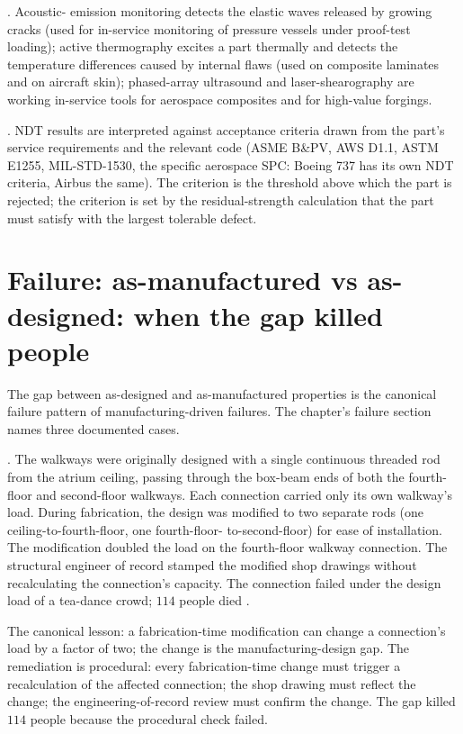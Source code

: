 . Acoustic-
emission monitoring detects the elastic waves released by growing
cracks (used for in-service monitoring of pressure vessels under
proof-test loading); active thermography excites a part thermally
and detects the temperature differences caused by internal flaws
(used on composite laminates and on aircraft skin); phased-array
ultrasound and laser-shearography are working in-service tools for
aerospace composites and for high-value forgings.

. NDT results are interpreted against
acceptance criteria drawn from the part's service requirements and
the relevant code (ASME B\&PV, AWS D1.1, ASTM E1255, MIL-STD-1530,
the specific aerospace SPC: Boeing 737 has its own NDT criteria,
Airbus the same). The criterion is the threshold above which the
part is rejected; the criterion is set by the residual-strength
calculation that the part must satisfy with the largest tolerable
defect.

\section{Failure: as-manufactured vs as-designed: when the gap killed people}

The gap between as-designed and as-manufactured properties is the
canonical failure pattern of manufacturing-driven failures. The
chapter's failure section names three documented cases.

. The walkways
were originally designed with a single continuous threaded rod from
the atrium ceiling, passing through the box-beam ends of both the
fourth-floor and second-floor walkways. Each connection carried only
its own walkway's load. During fabrication, the design was modified
to two separate rods (one ceiling-to-fourth-floor, one fourth-floor-
to-second-floor) for ease of installation. The modification doubled
the load on the fourth-floor walkway connection. The structural
engineer of record stamped the modified shop drawings without
recalculating the connection's capacity. The connection failed under
the design load of a tea-dance crowd; $114$ people died
\cite{acc:nbs-hyatt-1982}.

The canonical lesson: a fabrication-time modification can change a
connection's load by a factor of two; the change is the
manufacturing-design gap. The remediation is procedural: every
fabrication-time change must trigger a recalculation of the affected
connection; the shop drawing must reflect the change; the
engineering-of-record review must confirm the change. The gap killed
$114$ people because the procedural check failed.

